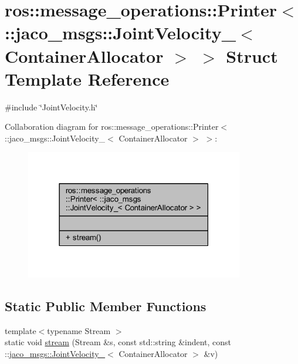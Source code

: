 \hypertarget{structros_1_1message__operations_1_1Printer_3_01_1_1jaco__msgs_1_1JointVelocity___3_01ContainerAllocator_01_4_01_4}{}\section{ros\+:\+:message\+\_\+operations\+:\+:Printer$<$ \+:\+:jaco\+\_\+msgs\+:\+:Joint\+Velocity\+\_\+$<$ Container\+Allocator $>$ $>$ Struct Template Reference}
\label{structros_1_1message__operations_1_1Printer_3_01_1_1jaco__msgs_1_1JointVelocity___3_01ContainerAllocator_01_4_01_4}


{\ttfamily \#include \char`\"{}Joint\+Velocity.\+h\char`\"{}}



Collaboration diagram for ros\+:\+:message\+\_\+operations\+:\+:Printer$<$ \+:\+:jaco\+\_\+msgs\+:\+:Joint\+Velocity\+\_\+$<$ Container\+Allocator $>$ $>$\+:
\nopagebreak
\begin{figure}[H]
\begin{center}
\leavevmode
\includegraphics[width=270pt]{d4/d33/structros_1_1message__operations_1_1Printer_3_01_1_1jaco__msgs_1_1JointVelocity___3_01ContainerAllocator_01_4_01_4__coll__graph}
\end{center}
\end{figure}
\subsection*{Static Public Member Functions}
\begin{DoxyCompactItemize}
\item 
{\footnotesize template$<$typename Stream $>$ }\\static void \hyperlink{structros_1_1message__operations_1_1Printer_3_01_1_1jaco__msgs_1_1JointVelocity___3_01ContainerAllocator_01_4_01_4_a5c0d5ba24dc6e3a95b16bc125064035e}{stream} (Stream \&s, const std\+::string \&indent, const \+::\hyperlink{structjaco__msgs_1_1JointVelocity__}{jaco\+\_\+msgs\+::\+Joint\+Velocity\+\_\+}$<$ Container\+Allocator $>$ \&v)
\end{DoxyCompactItemize}


